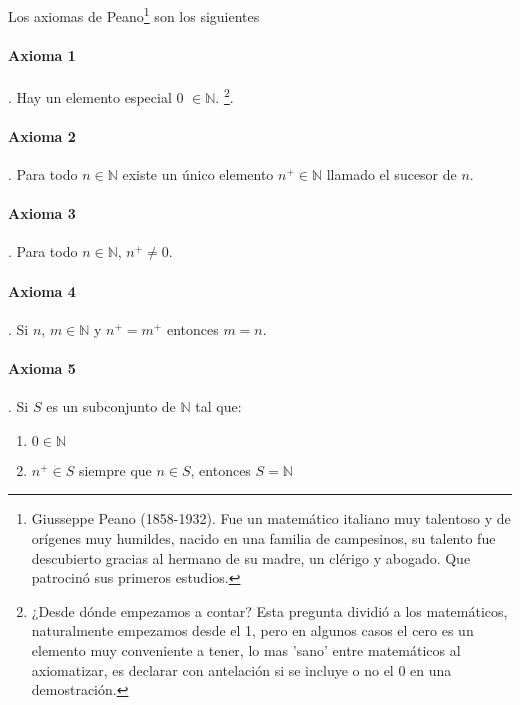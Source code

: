 \documentclass{article}
\begin{document}
Los axiomas de Peano\footnote{Giusseppe Peano (1858-1932). Fue un matemático italiano muy talentoso y de orígenes muy humildes, nacido en una familia de campesinos, su talento fue descubierto gracias al hermano de su madre, un clérigo y abogado. Que patrocinó sus primeros estudios.} son los siguientes\cite{tnumprincip_2004}

\paragraph{Axioma 1}. Hay un elemento especial 0 $\in \mathbb{N}$. \footnote{¿Desde dónde empezamos a contar? Esta pregunta dividió a los matemáticos, naturalmente empezamos desde el 1, pero en algunos casos el cero es un elemento muy conveniente a tener, lo mas 'sano' entre matemáticos al axiomatizar, es declarar con antelación si se incluye o no el 0 en una demostración.}.
\paragraph{Axioma 2}. Para todo $n \in \mathbb{N}$ existe un único elemento $n^+ \in \mathbb{N}$ llamado el sucesor de $n$.
\paragraph{Axioma 3}. Para todo $n \in \mathbb{N}$, $n^+ \neq 0$.
\paragraph{Axioma 4}. Si $n$, $m \in \mathbb{N}$ y $n^+ = m^+$ entonces $m = n$.
\paragraph{Axioma 5}. Si $S$ es un subconjunto de $\mathbb{N}$ tal que:
\begin{enumerate}
    \item $0 \in \mathbb{N}$
    \item $n^+ \in S$ siempre que $n \in S$, entonces $S = \mathbb{N}$
\end{enumerate}
\end{document}
